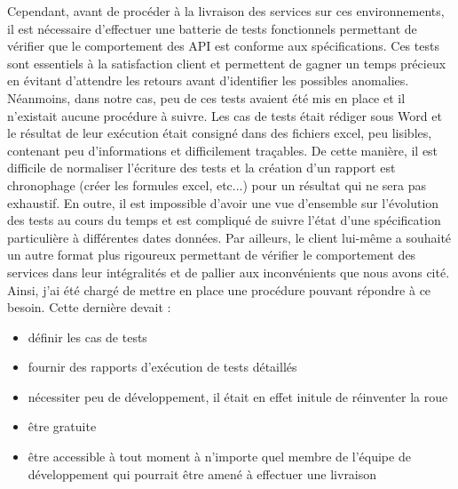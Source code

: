 	Cependant, avant de procéder à la livraison des services sur ces environnements, il est nécessaire d'effectuer une batterie de tests fonctionnels permettant de vérifier que le comportement des API est conforme aux spécifications. Ces tests sont essentiels à la satisfaction client et permettent de gagner un temps précieux en évitant d'attendre les retours avant d'identifier les possibles anomalies. Néanmoins, dans notre cas, peu de ces tests avaient été mis en place et il n'existait aucune procédure à suivre. Les cas de tests était rédiger sous Word et le résultat de leur exécution était consigné dans des fichiers excel, peu lisibles, contenant peu d'informations et difficilement traçables. De cette manière, il est difficile de normaliser l'écriture des tests et la création d'un rapport est chronophage (créer les formules excel, etc...) pour un résultat qui ne sera pas exhaustif. En outre, il est impossible d'avoir une vue d'ensemble sur l'évolution des tests au cours du temps et est compliqué de suivre l'état d'une spécification particulière à différentes dates données. Par ailleurs, le client lui-même a souhaité un autre format plus rigoureux permettant de vérifier le comportement des services dans leur intégralités et de pallier aux inconvénients que nous avons cité. \\
	
	Ainsi, j'ai été chargé de mettre en place une procédure pouvant répondre à ce besoin. Cette dernière devait :
	\begin{itemize}
		\item définir les cas de tests
		\item fournir des rapports d'exécution de tests détaillés
		\item nécessiter peu de développement, il était en effet initule de réinventer la roue
		\item être gratuite
		\item être accessible à tout moment à n'importe quel membre de l'équipe de développement qui pourrait être amené à effectuer une livraison
	\end{itemize}
	
	
